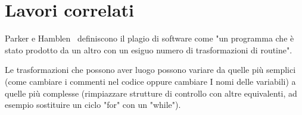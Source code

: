 \chapter{Lavori correlati}
	Parker e Hamblen~\citep{Parker1989} definiscono il plagio di software come "un programma che è stato prodotto da un altro con un esiguo numero di trasformazioni di routine". 
	
	Le trasformazioni che possono aver luogo possono variare da quelle più semplici (come cambiare i commenti nel codice oppure cambiare I nomi delle variabili) a quelle più complesse (rimpiazzare strutture di controllo con altre equivalenti, ad esempio sostituire un ciclo "for" con un "while"). 